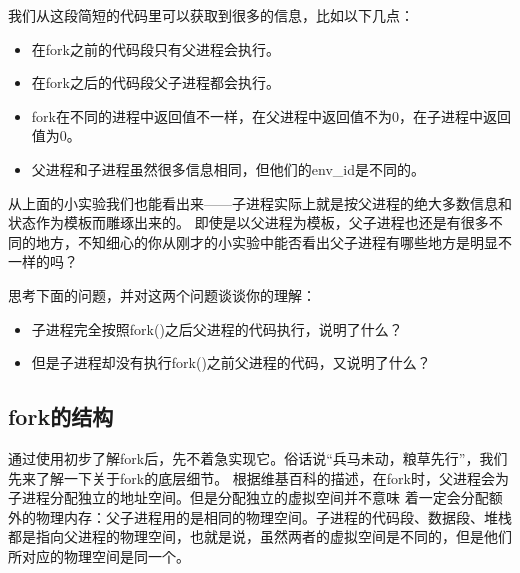我们从这段简短的代码里可以获取到很多的信息，比如以下几点：
\begin{itemize}
 \item 在fork之前的代码段只有父进程会执行。
 \item 在fork之后的代码段父子进程都会执行\label{fork与子进程}。
 \item fork在不同的进程中返回值不一样，在父进程中返回值不为0，在子进程中返回值为0。
 \item 父进程和子进程虽然很多信息相同，但他们的env\_id是不同的。
\end{itemize}

从上面的小实验我们也能看出来——子进程实际上就是按父进程的绝大多数信息和状态作为模板而雕琢出来的。
即使是以父进程为模板，父子进程也还是有很多不同的地方，不知细心的你从刚才的小实验中能否看出父子进程有哪些地方是明显不一样的吗？

\begin{thinking}\label{think-father-son}
 思考下面的问题，并对这两个问题谈谈你的理解：
  \begin{itemize}
   \item 子进程完全按照fork()之后父进程的代码执行，说明了什么？
   \item 但是子进程却没有执行fork()之前父进程的代码，又说明了什么？
  \end{itemize}
\end{thinking}



\subsection{fork的结构}

通过使用初步了解fork后，先不着急实现它。俗话说“兵马未动，粮草先行”，我们先来了解一下关于fork的底层细节。
根据维基百科的描述，在fork时，父进程会为子进程分配独立的地址空间。但是分配独立的虚拟空间并不意味
着一定会分配额外的物理内存：父子进程用的是相同的物理空间。子进程的代码段、数据段、堆栈
都是指向父进程的物理空间，也就是说，虽然两者的虚拟空间是不同的，但是他们所对应的物理空间是同一个。

